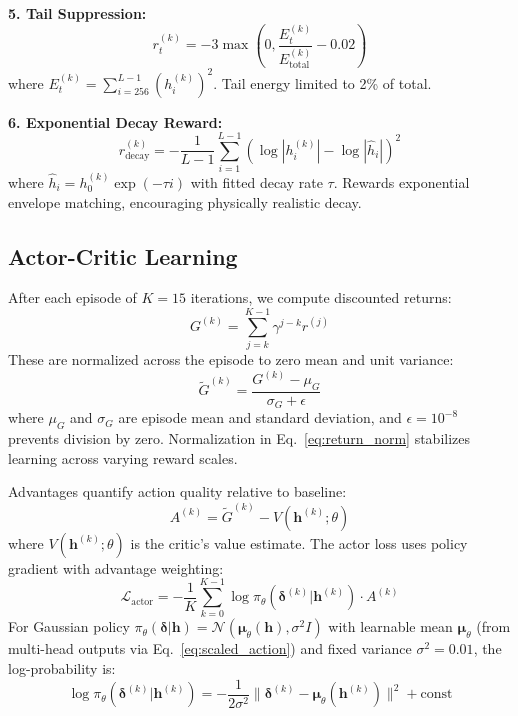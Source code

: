 \documentclass[12pt,a4paper]{article}
\begin{document}
\textbf{5. Tail Suppression:}
\begin{equation}
r_t^{(k)} = -3\max\left(0, \frac{E_t^{(k)}}{E_{\text{total}}^{(k)}} - 0.02\right)
\label{eq:tail_reward}
\end{equation}
where $E_t^{(k)} = \sum_{i=256}^{L-1} (h_i^{(k)})^2$. Tail energy limited to 2\% of total.

\textbf{6. Exponential Decay Reward:}
\begin{equation}
r_{\text{decay}}^{(k)} = -\frac{1}{L-1}\sum_{i=1}^{L-1} \left(\log|h_i^{(k)}| - \log|\hat{h}_i|\right)^2
\label{eq:decay_reward}
\end{equation}
where $\hat{h}_i = h_0^{(k)} \exp(-\tau i)$ with fitted decay rate $\tau$. Rewards exponential envelope matching, encouraging physically realistic decay.

\subsection{Actor-Critic Learning}
\label{sec:learning}

After each episode of $K=15$ iterations, we compute discounted returns:
\begin{equation}
G^{(k)} = \sum_{j=k}^{K-1} \gamma^{j-k} r^{(j)}
\label{eq:return}
\end{equation}
These are normalized across the episode to zero mean and unit variance:
\begin{equation}
\tilde{G}^{(k)} = \frac{G^{(k)} - \mu_G}{\sigma_G + \epsilon}
\label{eq:return_norm}
\end{equation}
where $\mu_G$ and $\sigma_G$ are episode mean and standard deviation, and $\epsilon=10^{-8}$ prevents division by zero. Normalization in Eq.~\eqref{eq:return_norm} stabilizes learning across varying reward scales.

Advantages quantify action quality relative to baseline:
\begin{equation}
A^{(k)} = \tilde{G}^{(k)} - V(\mathbf{h}^{(k)}; \theta)
\label{eq:advantage}
\end{equation}
where $V(\mathbf{h}^{(k)}; \theta)$ is the critic's value estimate. The actor loss uses policy gradient with advantage weighting:
\begin{equation}
\mathcal{L}_{\text{actor}} = -\frac{1}{K}\sum_{k=0}^{K-1} \log\pi_\theta(\boldsymbol{\delta}^{(k)}|\mathbf{h}^{(k)}) \cdot A^{(k)}
\label{eq:actor_loss}
\end{equation}
For Gaussian policy $\pi_\theta(\boldsymbol{\delta}|\mathbf{h}) = \mathcal{N}(\boldsymbol{\mu}_\theta(\mathbf{h}), \sigma^2 I)$ with learnable mean $\boldsymbol{\mu}_\theta$ (from multi-head outputs via Eq.~\eqref{eq:scaled_action}) and fixed variance $\sigma^2=0.01$, the log-probability is:
\begin{equation}
\log\pi_\theta(\boldsymbol{\delta}^{(k)}|\mathbf{h}^{(k)}) = -\frac{1}{2\sigma^2}\|\boldsymbol{\delta}^{(k)} - \boldsymbol{\mu}_\theta(\mathbf{h}^{(k)})\|^2 + \text{const}
\label{eq:log_prob}
\end{equation}
\end{document}

